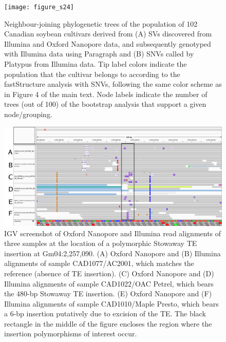 \documentclass[12pt]{article}
\newenvironment{lsfigure}
	{\begin{landscape} \begin{figure} \centering}
	{\end{figure} \end{landscape}}
\begin{document}
\clearpage%

\begin{lsfigure}
	\texttt{[image: figure\_s24]}

	\caption[Neighbour-joining phylogenetic trees of the population of 102 Canadian soybean cultivars]{
		Neighbour-joining phylogenetic trees of the population of 102 Canadian soybean cultivars derived from (A) SVs discovered from Illumina and Oxford Nanopore data, and subsequently genotyped with Illumina data using Paragraph and (B) SNVs called by Platypus from Illumina data.
		Tip label colors indicate the population that the cultivar belongs to according to the fastStructure analysis with SNVs, following the same color scheme as in Figure 4 of the main text.
		Node labels indicate the number of trees (out of 100) of the bootstrap analysis that support a given node/grouping.
	}

	\label{fig_s24}
\end{lsfigure}

\clearpage%

\begin{lsfigure}
	\includegraphics[width = 9.5in]{Gm04_2257090_annotated}

	\caption[IGV screenshot of Oxford Nanopore and Illumina read alignments of three samples at the location of a polymorphic Stowaway TE insertion]{
		IGV screenshot of Oxford Nanopore and Illumina read alignments of three samples at the location of a polymorphic Stowaway TE insertion at Gm04:2,257,090.
		(A) Oxford Nanopore and (B) Illumina alignments of sample CAD1077/AC2001, which matches the reference (absence of TE insertion).
		(C) Oxford Nanopore and (D) Illumina alignments of sample CAD1022/OAC Petrel, which bears the 480-bp Stowaway TE insertion.
		(E) Oxford Nanopore and (F) Illumina alignments of sample CAD1010/Maple Presto, which bears a 6-bp insertion putatively due to excision of the TE.
		The black rectangle in the middle of the figure encloses the region where the insertion polymorphisms of interest occur.
	}

	\label{fig_s25}

\end{lsfigure}
\end{document}
